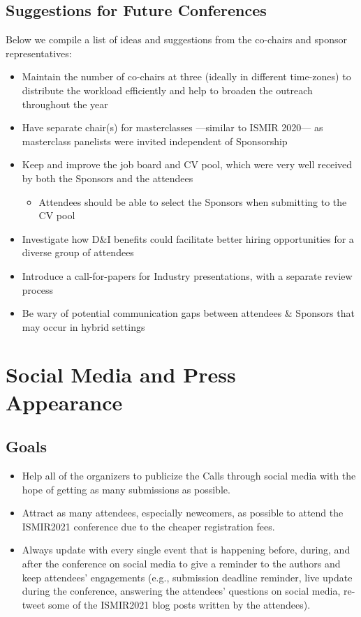 \documentclass[%
10pt,								%
titlepage,						%
]
{scrartcl}
\begin{document}
    \subsection{Suggestions for Future Conferences}
        Below we compile a list of ideas and suggestions from the co-chairs and sponsor representatives:
        \begin{itemize}
            \item   Maintain the number of co-chairs at three (ideally in different time-zones) to distribute the workload efficiently and help to broaden the outreach throughout the year 
            \item   Have separate chair(s) for masterclasses ---similar to ISMIR 2020--- as masterclass panelists were invited independent of Sponsorship
            \item   Keep and improve the job board and CV pool, which were very well received by both the Sponsors and the attendees
            \begin{itemize}
                \item Attendees should be able to select the Sponsors when submitting to the CV pool
            \end{itemize}
            \item   Investigate how D\&I benefits could facilitate better hiring opportunities for a diverse group of attendees
            \item   Introduce a call-for-papers for Industry presentations, with a separate review process 
            \item   Be wary of potential communication gaps between attendees \& Sponsors that may occur in hybrid settings
        \end{itemize}


\section{Social Media and Press Appearance}
    \subsection{Goals}
        \begin{itemize}
            \item   Help all of the organizers to publicize the Calls through social media with the hope of getting as many submissions as possible.
            \item   Attract as many attendees, especially newcomers, as possible to attend the ISMIR2021 conference due to the cheaper registration fees.
            \item   Always update with every single event that is happening before, during, and after the conference on social media to give a reminder to the authors and keep attendees' engagements (e.g., submission deadline reminder, live update during the conference, answering the attendees' questions on social media, re-tweet some of the ISMIR2021 blog posts written by the attendees).
        \end{itemize}
        
\end{document}
